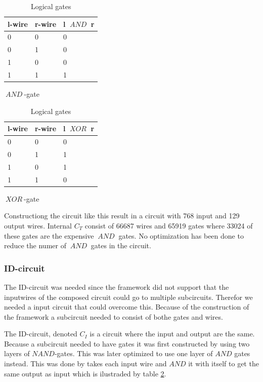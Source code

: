 \documentclass[10pt,a4paper]{article}
\newcommand{\AND}{\ensuremath{~AND~}}
\newcommand{\XOR}{\ensuremath{~XOR~}}
\begin{document}
\begin{table}[h]
    \begin{subtable}{.5\linewidth}
    \centering
    \begin{tabular}{l l || l}
        l-wire & r-wire & l $\AND$ r    \\\hline
        0 & 0 & 0    \\
        0 & 1 & 0    \\
        1 & 0 & 0    \\
        1 & 1 & 1    
    \end{tabular}
    \caption{$\AND$-gate}
    \end{subtable}%
    \begin{subtable}{.5\linewidth}
    \centering
    \begin{tabular}{l l || l}
        l-wire & r-wire & l $\XOR$ r    \\\hline
        0 & 0 & 0    \\
        0 & 1 & 1    \\
        1 & 0 & 1    \\
        1 & 1 & 0    
    \end{tabular}
    \caption{$\XOR$-gate}
    \end{subtable} 
\caption{Logical gates }
\label{and xor gates}
\end{table}

Constructiong the circuit like this result in a circuit with 768 input and 129 output
wires. Internal $C_T$ consist of 66687 wires and 65919 gates where 33024 of these gates are the expensive $\AND$ gates. No optimization has been done to reduce the numer of $\AND$ gates in the circuit.

\subsubsection{ID-circuit}
The ID-circuit was needed since the framework did not support that the inputwires of the composed circuit could go to multiple subcircuits. Therefor we needed a input circuit that could overcome this. Because of the construction of the framework a subcircuit needed to consist of bothe gates and wires.

\bigskip
The ID-circuit, denoted $C_{I}$ is a circuit where the input and output are the same. Because a subcircuit needed to have gates it was first constructed by using two layers of $NAND$-gates. This was later optimized to use one layer of $AND$ gates instead. This was done by takes each input wire and $AND$ it with itself to get the same output as input which is ilustraded by table \ref{and xor gates}.
\end{document}
